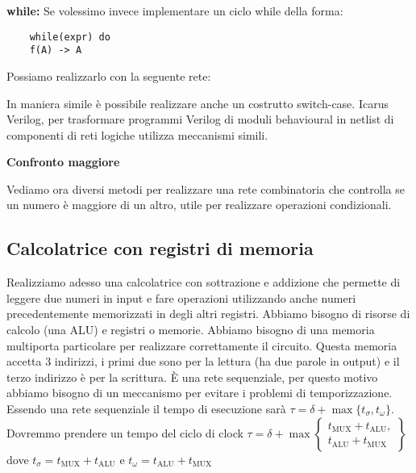 \begin{defn}
	\textbf{while:}
	Se volessimo invece implementare un ciclo while della forma:
	\begin{Verbatim}
	while(expr) do
	f(A) -> A
	\end{Verbatim}
	Possiamo realizzarlo con la seguente rete:
	
	
	In maniera simile è possibile realizzare anche un costrutto switch-case.
	Icarus Verilog, per trasformare programmi Verilog di moduli behavioural in netlist di componenti di reti logiche utilizza meccanismi simili.
\end{defn}

\begin{exrc}
	\textbf{Confronto maggiore}
	
	Vediamo ora diversi metodi per realizzare una rete combinatoria che controlla se un numero è maggiore di un altro, utile per realizzare operazioni condizionali.
	
	
	\FloatBarrier	
\end{exrc}


\subsection{Calcolatrice con registri di memoria}
Realizziamo adesso una calcolatrice con sottrazione e addizione che permette di leggere due numeri in input e fare operazioni utilizzando anche numeri precedentemente memorizzati in degli altri registri. Abbiamo bisogno di risorse di calcolo (una ALU) e registri o memorie. Abbiamo bisogno di una memoria multiporta particolare per realizzare correttamente il circuito. Questa memoria accetta 3 indirizzi, i primi due sono per la lettura (ha due parole in output) e il terzo indirizzo è per la scrittura. È una rete sequenziale, per questo motivo abbiamo bisogno di un meccanismo per evitare i problemi di temporizzazione. Essendo una rete sequenziale il tempo di esecuzione sarà $ \tau = \delta + \max\{t_\sigma, t_\omega\} $. Dovremmo prendere un tempo del ciclo di clock $ \tau = \delta + \max \left\{\begin{matrix}
t_\text{MUX} + t_\text{ALU}, \\
t_\text{ALU} + t_\text{MUX}
\end{matrix}\right\} $ dove $ t_\sigma = t_\text{MUX} + t_\text{ALU} $ e $ t_\omega = t_\text{ALU} + t_\text{MUX} $

